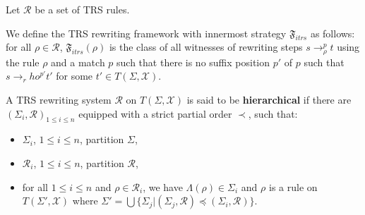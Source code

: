 \begin{definition}
  Let $\mathcal{R}$ be a set of TRS rules. 

  We define the TRS rewriting framework with innermost strategy $\mathfrak{F}_{itrs}$ as follows: for all $\rho \in \mathcal{R}$, $\mathfrak{F}_{itrs}(\rho)$ is the class of all witnesses of rewriting steps $s \to_\rho^p t$ using the rule $\rho$ and a match $p$ such that there is no suffix position $p'$ of $p$ such that $s \to_rho^{p'} t'$ for some $t' \in T(\Sigma,\mathcal{X})$.
\end{definition}


  \begin{definition}
    A TRS rewriting system $\mathcal{R}$ on $T(\Sigma, \mathcal{X})$ is said to be \textbf{hierarchical} if there are $(\Sigma_i, \mathcal{R})_{1 \leq i \leq n}$ equipped with a strict partial order $\prec$, such that:
    \begin{itemize}
      \item $\Sigma_i$, $1 \leq i \leq n$, partition $\Sigma$,
      \item $\mathcal{R}_i$, $1 \leq i \leq n$, partition $\mathcal{R}$,
      \item for all $1 \leq i \leq n$ and $\rho \in \mathcal{R}_i$, we have $\Lambda(\rho) \in \Sigma_i$ and $\rho$ is a rule on $T(\Sigma', \mathcal{X})$ where 
      $\Sigma' = \bigcup \{ \Sigma_j | (\Sigma_j, \mathcal{R}) \preceq (\Sigma_i, \mathcal{R}) \}$.
    \end{itemize}
  \end{definition}

